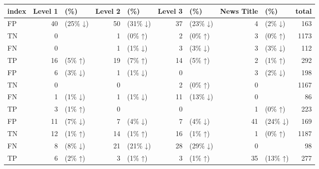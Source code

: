 \begin{tabular}{lrlrlrlrlr}
\toprule
index & Level 1 & (\%) & Level 2 & (\%) & Level 3 & (\%) & News Title & (\%) & total \\
\midrule
FP & 40 & (25\% ↓) & 50 & (31\% ↓) & 37 & (23\% ↓) & 4 & (2\% ↓) & 163 \\
TN & 0 &  & 1 & (0\% ↑) & 2 & (0\% ↑) & 3 & (0\% ↑) & 1173 \\
FN & 0 &  & 1 & (1\% ↓) & 3 & (3\% ↓) & 3 & (3\% ↓) & 112 \\
TP & 16 & (5\% ↑) & 19 & (7\% ↑) & 14 & (5\% ↑) & 2 & (1\% ↑) & 292 \\
FP & 6 & (3\% ↓) & 1 & (1\% ↓) & 0 &  & 3 & (2\% ↓) & 198 \\
TN & 0 &  & 0 &  & 2 & (0\% ↑) & 0 &  & 1167 \\
FN & 1 & (1\% ↓) & 1 & (1\% ↓) & 11 & (13\% ↓) & 0 &  & 86 \\
TP & 3 & (1\% ↑) & 0 &  & 0 &  & 1 & (0\% ↑) & 223 \\
FP & 11 & (7\% ↓) & 7 & (4\% ↓) & 7 & (4\% ↓) & 41 & (24\% ↓) & 169 \\
TN & 12 & (1\% ↑) & 14 & (1\% ↑) & 16 & (1\% ↑) & 1 & (0\% ↑) & 1187 \\
FN & 8 & (8\% ↓) & 21 & (21\% ↓) & 28 & (29\% ↓) & 0 &  & 98 \\
TP & 6 & (2\% ↑) & 3 & (1\% ↑) & 3 & (1\% ↑) & 35 & (13\% ↑) & 277 \\
\bottomrule
\end{tabular}
